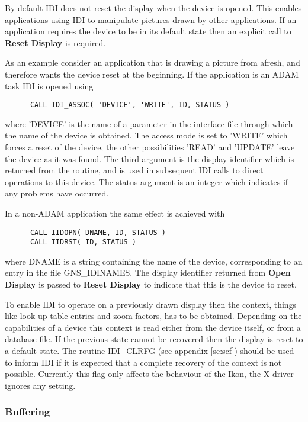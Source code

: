 By default IDI does not reset the display when the device is opened.
This enables applications using IDI to manipulate pictures drawn by
other applications. If an application requires the device to be in its
default state then an explicit call to {\bf Reset Display} is required.

As an example consider an application that is drawing a picture from
afresh, and therefore wants the device reset at the beginning. If the
application is an ADAM task IDI is opened using
\begin{small}
\begin{verbatim}
      CALL IDI_ASSOC( 'DEVICE', 'WRITE', ID, STATUS )
\end{verbatim}
\end{small}
where 'DEVICE' is the name of a parameter in the interface file
through which the name of the device is obtained. The access mode
is set to 'WRITE' which forces a reset of the device, the other
possibilities 'READ' and 'UPDATE' leave the device as it was found.
The third argument is the display identifier which is returned from
the routine, and is used in subsequent IDI calls to direct operations
to this device. The status argument is an integer which indicates if
any problems have occurred.

In a non-ADAM application the same effect is achieved with
\begin{small}
\begin{verbatim}
      CALL IIDOPN( DNAME, ID, STATUS )
      CALL IIDRST( ID, STATUS )
\end{verbatim}
\end{small}
where DNAME is a string containing the name of the device, corresponding
to an entry in the file GNS\_IDINAMES. The display identifier returned
from {\bf Open Display} is passed to {\bf Reset Display} to indicate
that this is the device to reset.

To enable IDI to operate on a previously drawn display then the context,
things like look-up table entries and zoom factors, has to be obtained.
Depending on the capabilities of a device this context is read either
from the device itself, or from a database file. If the previous state
cannot be recovered then the display is reset to a default state. The
routine IDI\_CLRFG (see appendix \ref{se:scf}) should be used to inform IDI
if it is expected that a complete recovery of the context is not possible.
Currently this flag only affects the behaviour of the Ikon, the X-driver
ignores any setting.

\subsubsection{Buffering}

